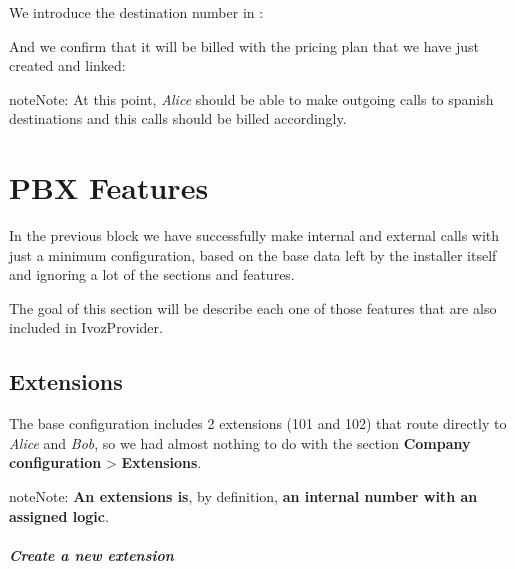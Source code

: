 \documentclass[letterpaper,10pt,english]{sphinxmanual}
\begin{document}
\noindent{}

We introduce the destination number in {\hyperref[external_incoming_calls/numeric_transformations:e164]{}}:


And we confirm that it will be billed with the pricing plan that we have just
created and linked:

\noindent{}

\begin{notice}{note}{Note:}
At this point, \emph{Alice} should be able to make outgoing calls to
spanish destinations and this calls should be billed accordingly.
\end{notice}


\chapter{PBX Features}
\label{pbx_features/index:pbx-features}\label{pbx_features/index::doc}
In the previous block we have successfully make internal and external calls
with just a minimum configuration, based on the base data left by the installer
itself and ignoring a lot of the sections and features.

The goal of this section will be describe each one of those features that
are also included in IvozProvider.


\section{Extensions}
\label{pbx_features/extensions:extensions}\label{pbx_features/extensions::doc}
The base configuration includes 2 extensions (101 and 102) that route directly
to \emph{Alice} and \emph{Bob}, so we had almost nothing to do with the section
\textbf{Company configuration} \textgreater{} \textbf{Extensions}.

\begin{notice}{note}{Note:}
\textbf{An extensions is}, by definition, \textbf{an internal number with an
assigned logic}.
\end{notice}
\paragraph{Create a new extension}
\end{document}

